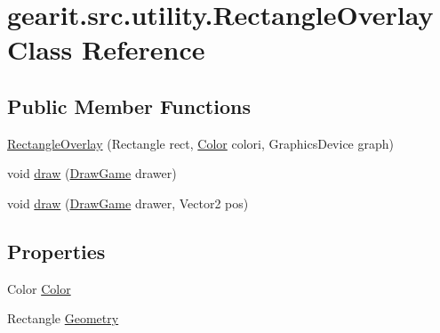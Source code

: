 \hypertarget{classgearit_1_1src_1_1utility_1_1_rectangle_overlay}{\section{gearit.\+src.\+utility.\+Rectangle\+Overlay Class Reference}
\label{classgearit_1_1src_1_1utility_1_1_rectangle_overlay}
}
\subsection*{Public Member Functions}
\begin{DoxyCompactItemize}
\item 
\hyperlink{classgearit_1_1src_1_1utility_1_1_rectangle_overlay_aa6c6aa7824fbe4a88755295ef9b679be}{Rectangle\+Overlay} (Rectangle rect, \hyperlink{classgearit_1_1src_1_1utility_1_1_rectangle_overlay_a429feec3fafa78d4189caa203ad6ad7e}{Color} colori, Graphics\+Device graph)
\item 
void \hyperlink{classgearit_1_1src_1_1utility_1_1_rectangle_overlay_a0b4eb7ca8587dc2e0079d77266ce207f}{draw} (\hyperlink{classgearit_1_1src_1_1_draw_game}{Draw\+Game} drawer)
\item 
void \hyperlink{classgearit_1_1src_1_1utility_1_1_rectangle_overlay_a578c68b447b3fa11da989a42b18c13cf}{draw} (\hyperlink{classgearit_1_1src_1_1_draw_game}{Draw\+Game} drawer, Vector2 pos)
\end{DoxyCompactItemize}
\subsection*{Properties}
\begin{DoxyCompactItemize}
\item 
Color \hyperlink{classgearit_1_1src_1_1utility_1_1_rectangle_overlay_a429feec3fafa78d4189caa203ad6ad7e}{Color}
\item 
Rectangle \hyperlink{classgearit_1_1src_1_1utility_1_1_rectangle_overlay_ad57ed4bcfb9a6271e1cc9e9ada91250c}{Geometry}
\end{DoxyCompactItemize}


